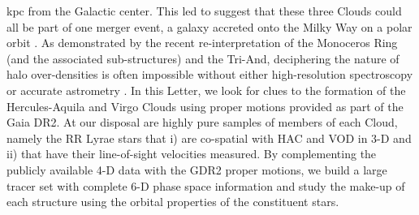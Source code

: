\documentclass[fleqn,usenatbib]{mnras}
\begin{document}
kpc from the Galactic center. This led \citet{Li2016} to suggest that
these three Clouds could all be part of one merger event, a galaxy
accreted onto the Milky Way on a polar orbit \citep[see also][]{Juric2008}.
As demonstrated by the recent re-interpretation of the Monoceros Ring
(and the associated sub-structures) and the Tri-And, deciphering the
nature of halo over-densities is often impossible without either
high-resolution spectroscopy \citep[e.g.][]{Bergemann2018} or accurate
astrometry \citep[e.g.][]{deBoer2018,Deason2018}. In this Letter, we
look for clues to the formation of the Hercules-Aquila and Virgo
Clouds using proper motions provided as part of the Gaia DR2. At our
disposal are highly pure samples of members of each Cloud, namely the
RR Lyrae stars that i) are co-spatial with HAC and VOD in 3-D and ii)
that have their line-of-sight velocities measured. By complementing
the publicly available 4-D data with the GDR2 proper motions, we build
a large tracer set with complete 6-D phase space information and study
the make-up of each structure using the orbital properties of the
constituent stars.
%
\end{document}
